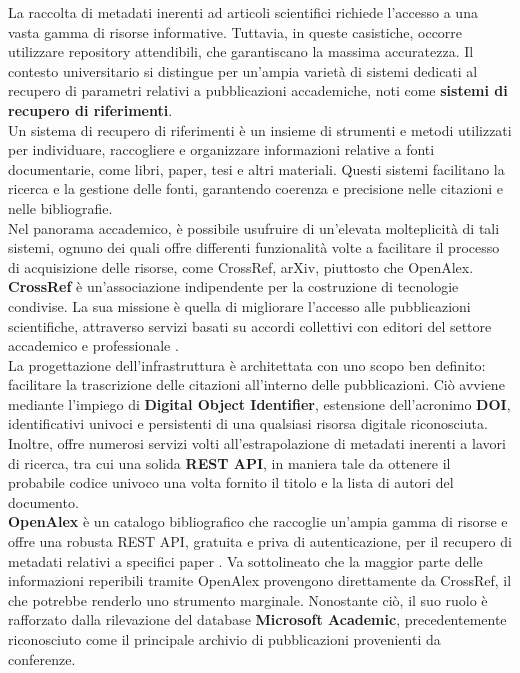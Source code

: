 La raccolta di metadati inerenti ad articoli scientifici richiede l'accesso a una vasta gamma di risorse informative. Tuttavia, in queste casistiche, occorre utilizzare repository attendibili, che garantiscano la massima accuratezza. Il contesto universitario si distingue per un'ampia varietà di sistemi dedicati al recupero di parametri relativi a pubblicazioni accademiche, noti come \textbf{sistemi di recupero di riferimenti}. \vspace{7pt} \\
Un sistema di recupero di riferimenti è un insieme di strumenti e metodi utilizzati per individuare, raccogliere e organizzare informazioni relative a fonti documentarie, come libri, paper, tesi e altri materiali. Questi sistemi facilitano la ricerca e la gestione delle fonti, garantendo coerenza e precisione nelle citazioni e nelle bibliografie. \vspace{7pt} \\
Nel panorama accademico, è possibile usufruire di un'elevata molteplicità di tali sistemi, ognuno dei quali offre differenti funzionalità volte a facilitare il processo di acquisizione delle risorse, come CrossRef, arXiv, piuttosto che OpenAlex. \vspace{7pt} \\
\textbf{CrossRef} è un'associazione indipendente per la costruzione di tecnologie condivise. La sua missione è quella di migliorare l'accesso alle pubblicazioni scientifiche, attraverso servizi basati su accordi collettivi con editori del settore accademico e professionale \cite{Howells01042006}. \vspace{7pt} \\
La progettazione dell'infrastruttura è architettata con uno scopo ben definito: facilitare la trascrizione delle citazioni all'interno delle pubblicazioni. Ciò avviene mediante l'impiego di \textbf{Digital Object Identifier}, estensione dell'acronimo \textbf{DOI}, identificativi univoci e persistenti di una qualsiasi risorsa digitale riconosciuta. Inoltre, offre numerosi servizi volti all'estrapolazione di metadati inerenti a lavori di ricerca, tra cui una solida \textbf{REST API}, in maniera tale da ottenere il probabile codice univoco una volta fornito  il titolo e la lista di autori del documento. \vspace{7pt} \\
\textbf{OpenAlex} è un catalogo bibliografico che raccoglie un'ampia gamma di risorse e offre una robusta REST API, gratuita e priva di autenticazione, per il recupero di metadati relativi a specifici paper \cite{openalex}. Va sottolineato che la maggior parte delle informazioni reperibili tramite OpenAlex provengono direttamente da CrossRef, il che potrebbe renderlo uno strumento marginale. Nonostante ciò, il suo ruolo è rafforzato dalla rilevazione del database \textbf{Microsoft Academic}, precedentemente riconosciuto come il principale archivio di pubblicazioni provenienti da conferenze.